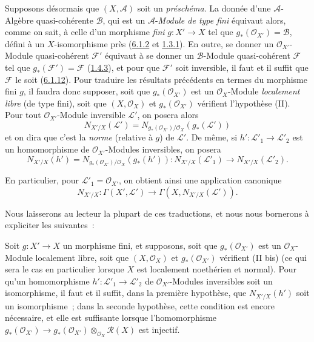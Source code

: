 \begin{env}[6.5.5]
\label{II.6.5.5-fr}
Supposons désormais que $(X,\mathcal{A})$ soit un \emph{préschéma}. La donnée
d'une $\mathcal{A}$-Algèbre quasi-cohérente $\mathcal{B}$, qui est un
$\mathcal{A}$-\emph{Module de type fini} équivaut alors, comme on sait, à
celle d'un morphisme \emph{fini} $g:X'\to X$ tel que
$g_*(\mathcal{O}_{X'})=\mathcal{B}$, défini à un $X$-isomorphisme près
(\hyperref[II.6.1.2-fr]{6.1.2} et \hyperref[II.1.3.1-fr]{1.3.1}). En outre,
se donner un $\mathcal{O}_{X'}$-Module quasi-cohérent $\mathcal{F}'$ équivaut
à se donner un $\mathcal{B}$-Module quasi-cohérent $\mathcal{F}$ tel que
$g_*(\mathcal{F}')=\mathcal{F}$ (\hyperref[II.1.4.3-fr]{1.4.3}), et pour que
$\mathcal{F}'$ soit inversible, il faut et il suffit que $\mathcal{F}$ le soit
(\hyperref[II.6.1.12-fr]{6.1.12}). Pour traduire les résultats précédents en
termes du morphisme fini $g$, il faudra donc supposer, soit que
$g_*(\mathcal{O}_{X'})$ est un $\mathcal{O}_X$-Module \emph{localement libre}
(de type fini), soit que $(X,\mathcal{O}_X)$ et $g_*(\mathcal{O}_{X'})$
vérifient l'hypothèse (II). Pour tout $\mathcal{O}_{X'}$-Module inversible
$\mathcal{L}'$, on posera alors
\[
\label{II.6.5.5.1-fr}
N_{X'/X}(\mathcal{L}')
=N_{g_*(\mathcal{O}_{X'})/\mathcal{O}_X}(g_*(\mathcal{L}'))
\tag{6.5.5.1}
\]
et on dira que c'est la \emph{norme} (relative à $g$) de $\mathcal{L}'$. De
même, si $h':\mathcal{L}'_1\to\mathcal{L}'_2$ est un homomorphisme de
$\mathcal{O}_{X'}$-Modules inversibles, on posera
\[
\label{II.6.5.5.2-fr}
N_{X'/X}(h')
=N_{g_*(\mathcal{O}_{X'})/\mathcal{O}_X}(g_*(h')):
N_{X'/X}(\mathcal{L}'_1)\to N_{X'/X}(\mathcal{L}'_2).
\tag{6.5.5.2}
\]

En particulier, pour $\mathcal{L}'_1=\mathcal{O}_{X'}$, on obtient ainsi une
application canonique
\[
\label{II.6.5.5.3-fr}
N_{X'/X}:\Gamma(X',\mathcal{L}')
\to\Gamma(X,N_{X'/X}(\mathcal{L}')).
\tag{6.5.5.3}
\]

Nous laisserons au lecteur la plupart de ces traductions, et nous nous bornerons à
expliciter les suivantes~:
\end{env}

\begin{proposition}[6.5.6]
\label{II.6.5.6-fr}
Soit $g:X'\to X$ un morphisme fini, et supposons, soit que
$g_*(\mathcal{O}_{X'})$ est un $\mathcal{O}_X$-Module localement libre, soit
que $(X,\mathcal{O}_X)$ et $g_*(\mathcal{O}_{X'})$ vérifient \textup{(II bis)}
(ce qui sera le cas en particulier lorsque $X$ est localement noethérien et
normal). Pour qu'un homomorphisme $h':\mathcal{L}'_1\to\mathcal{L}'_2$ de
$\mathcal{O}_{X'}$-Modules inversibles soit un isomorphisme, il faut et il
suffit, dans la première hypothèse, que $N_{X'/X}(h')$ soit un isomorphisme~;
dans la seconde hypothèse, cette condition est encore nécessaire, et elle est
suffisante lorsque l'homomorphisme
$g_*(\mathcal{O}_{X'})\to
g_*(\mathcal{O}_{X'})\otimes_{\mathcal{O}_X}\mathcal{R}(X)$ est injectif.
\end{proposition}

